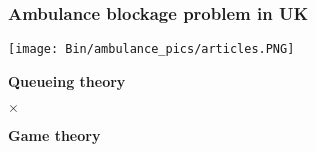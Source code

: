 \begin{frame}
    \frametitle{Ambulance blockage problem in UK}
    \centering

    \texttt{[image: Bin/ambulance\_pics/articles.PNG]}
        
\end{frame}



\begin{frame}
    \Huge
    \centering

    \textbf{Queueing theory}

    \(\times\)

    \textbf{Game theory}
    
\end{frame}
